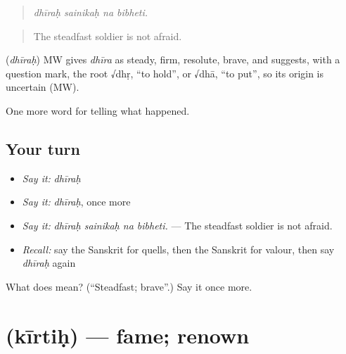 \begin{quote}
   
\end{quote}

\begin{quote}
\emph{dhīraḥ sainikaḥ na bibheti.}
\end{quote}

\begin{quote}
The steadfast soldier is not afraid.
\end{quote}

\begin{cousinweb}
\textbf{} (\emph{dhīraḥ}) MW gives \emph{dhīra} as steady, firm, resolute, brave, and suggests, with a question mark, the root √dhṛ, \textquotedblleft{}to hold\textquotedblright{}, or √dhā, \textquotedblleft{}to put\textquotedblright{}, so its origin is uncertain (MW).
\end{cousinweb}

\begin{grammarlens}[title={What you've built}]
One more word for telling what happened.
\end{grammarlens}

\subsection*{Your turn}
\begin{itemize}
\raggedright
  \item \emph{Say it:} \emph{dhīraḥ}
  \item \emph{Say it:} \emph{dhīraḥ}, once more
  \item \emph{Say it:} \emph{dhīraḥ sainikaḥ na bibheti.} — The steadfast soldier is not afraid.
  \item \emph{Recall:} say the Sanskrit for quells, then the Sanskrit for valour, then say \emph{dhīraḥ} again
\end{itemize}

\begin{tcolorbox}[breakable,colback=teal!4,colframe=teal!35!black,title={Before you move on}]
What does  mean? (\textquotedblleft{}Steadfast; brave\textquotedblright{}.) Say it once more.
\end{tcolorbox}
\section[\texorpdfstring{\sk{कीर्तिः} (kīrtiḥ)}{कीर्तिः (kīrtiḥ)}]{ (kīrtiḥ) — fame; renown}

